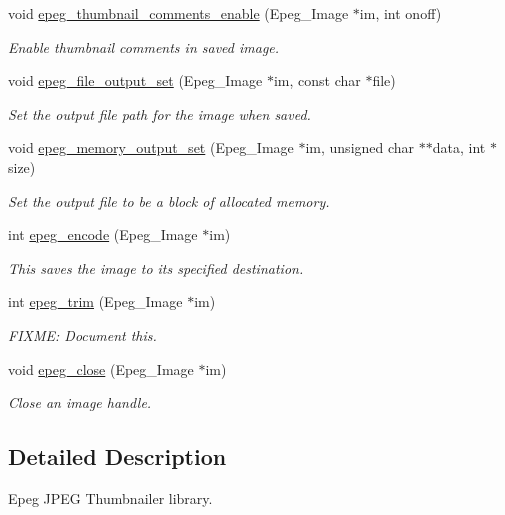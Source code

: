 \begin{DoxyCompactItemize}
void \hyperlink{epeg_8c_a5cfe689f77dbe7b120317a195585ee51}{epeg\+\_\+thumbnail\+\_\+comments\+\_\+enable} (Epeg\+\_\+\+Image $\ast$im, int onoff)
\begin{DoxyCompactList}\small\item\em Enable thumbnail comments in saved image. \end{DoxyCompactList}\item 
void \hyperlink{epeg_8c_a4aa4c7bbf3edf1f24603d3b4dad684b4}{epeg\+\_\+file\+\_\+output\+\_\+set} (Epeg\+\_\+\+Image $\ast$im, const char $\ast$file)
\begin{DoxyCompactList}\small\item\em Set the output file path for the image when saved. \end{DoxyCompactList}\item 
void \hyperlink{epeg_8c_ae0e91c160074e6d96b7e366fb0eb6ec8}{epeg\+\_\+memory\+\_\+output\+\_\+set} (Epeg\+\_\+\+Image $\ast$im, unsigned char $\ast$$\ast$data, int $\ast$size)
\begin{DoxyCompactList}\small\item\em Set the output file to be a block of allocated memory. \end{DoxyCompactList}\item 
int \hyperlink{epeg_8c_a12a018084510ebdc0e627f56305fea79}{epeg\+\_\+encode} (Epeg\+\_\+\+Image $\ast$im)
\begin{DoxyCompactList}\small\item\em This saves the image to its specified destination. \end{DoxyCompactList}\item 
int \hyperlink{epeg_8c_a327dab144744ba5f1892643d627e6df0}{epeg\+\_\+trim} (Epeg\+\_\+\+Image $\ast$im)
\begin{DoxyCompactList}\small\item\em F\+I\+X\+M\+E\+: Document this. \end{DoxyCompactList}\item 
void \hyperlink{epeg_8c_a8faf0f0fab47ac97b86ee7e00e1bee7c}{epeg\+\_\+close} (Epeg\+\_\+\+Image $\ast$im)
\begin{DoxyCompactList}\small\item\em Close an image handle. \end{DoxyCompactList}\end{DoxyCompactItemize}


\subsection{Detailed Description}
Epeg J\+P\+E\+G Thumbnailer library. 

